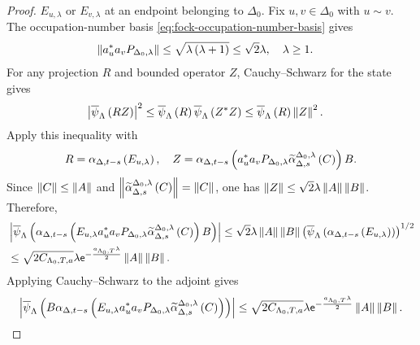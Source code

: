 \documentclass[11pt,a4paper]{article}
\theoremstyle{plain}
\theoremstyle{definition}
\theoremstyle{remark}
\begin{document}
\begin{proof}
$E_{u,\lambda}$ or $E_{v,\lambda}$ at an endpoint belonging to $\Delta_0$.
Fix $u,v\in \Delta_0$ with $u\sim v$.
The occupation-number basis \eqref{eq:fock-occupation-number-basis} gives
$$\begin{aligned}
\left\Vert a_u^{\ast}a_vP_{\Delta_0,\lambda} \right\Vert
& \leq
\sqrt{\lambda\left( \lambda+1 \right)}
\leq
\sqrt{2}\lambda,
\quad
\lambda\geq1.
\end{aligned}$$
For any projection $R$ and bounded operator $Z$, Cauchy--Schwarz for the state gives
$$\begin{aligned}
\abs{\fun{\oastate[\overline{\psi}_{\Lambda}]}{RZ}}^2
& \leq
\fun{\oastate[\overline{\psi}_{\Lambda}]}{R}
\fun{\oastate[\overline{\psi}_{\Lambda}]}{\faadj{Z}Z}
\leq
\fun{\oastate[\overline{\psi}_{\Lambda}]}{R}\norm{Z}^2.
\end{aligned}$$
Apply this inequality with
$$\begin{aligned}
R
=
\alpha_{\Delta,t-s} \left( E_{u,\lambda} \right),
\quad
Z
=
\alpha_{\Delta,t-s} \left( 
a_u^{\ast}a_vP_{\Delta_0,\lambda}
\widetilde{\alpha}_{\Delta,s}^{\Delta_0,\lambda} \left( C \right) \right)B.
\end{aligned}$$
Since $\left\Vert C \right\Vert\leq\left\Vert A \right\Vert$ and
$\left\Vert \widetilde{\alpha}_{\Delta,s}^{\Delta_0,\lambda} \left( C \right) \right\Vert=\left\Vert C \right\Vert$, one has
$\left\Vert Z \right\Vert
\leq
\sqrt{2}\lambda\left\Vert A \right\Vert\left\Vert B \right\Vert$.
Therefore,
\begin{equation}
\begin{aligned}
&
\abs{\fun{\oastate[\overline{\psi}_{\Lambda}]}{
\fun{\alpha_{\Delta,t-s}}{
E_{u,\lambda}
\faadj{a_u}a_vP_{\Delta_0,\lambda}
\fun{\widetilde{\alpha}_{\Delta,s}^{\Delta_0,\lambda}}{C}}B}}
\leq
\sqrt{2}\lambda\norm{A}\norm{B}
\rbk{\fun{\oastate[\overline{\psi}_{\Lambda}]}{
\fun{\alpha_{\Delta,t-s}}{E_{u,\lambda}}}}^{1/2}
\\
& \leq
\sqrt{2C_{\Lambda_0,T,a}}\lambda
\napiernum^{-\frac{a_{\Lambda_0,T}\lambda}{2}}
\norm{A}\norm{B}.
\end{aligned}
\label{eq:fock-right-cutoff-integrand-bound}
\end{equation}
Applying Cauchy--Schwarz to the adjoint gives
\begin{equation}
\begin{aligned}
\abs{\fun{\oastate[\overline{\psi}_{\Lambda}]}{
B\fun{\alpha_{\Delta,t-s}}{
E_{u,\lambda}
\faadj{a_u}a_vP_{\Delta_0,\lambda}
\fun{\widetilde{\alpha}_{\Delta,s}^{\Delta_0,\lambda}}{C}}}}
\leq
\sqrt{2C_{\Lambda_0,T,a}}\lambda
\napiernum^{-\frac{a_{\Lambda_0,T}\lambda}{2}}
\norm{A}\norm{B}.
\end{aligned}
\label{eq:fock-left-cutoff-integrand-bound}

\end{equation}
\end{proof}
\end{document}
